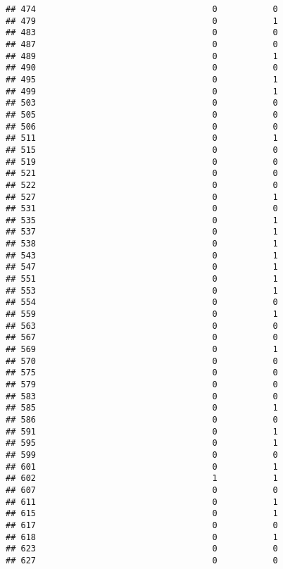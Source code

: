 \documentclass[
]{article}
\begin{document}
\begin{verbatim}
## 474                                   0           0
## 479                                   0           1
## 483                                   0           0
## 487                                   0           0
## 489                                   0           1
## 490                                   0           0
## 495                                   0           1
## 499                                   0           1
## 503                                   0           0
## 505                                   0           0
## 506                                   0           0
## 511                                   0           1
## 515                                   0           0
## 519                                   0           0
## 521                                   0           0
## 522                                   0           0
## 527                                   0           1
## 531                                   0           0
## 535                                   0           1
## 537                                   0           1
## 538                                   0           1
## 543                                   0           1
## 547                                   0           1
## 551                                   0           1
## 553                                   0           1
## 554                                   0           0
## 559                                   0           1
## 563                                   0           0
## 567                                   0           0
## 569                                   0           1
## 570                                   0           0
## 575                                   0           0
## 579                                   0           0
## 583                                   0           0
## 585                                   0           1
## 586                                   0           0
## 591                                   0           1
## 595                                   0           1
## 599                                   0           0
## 601                                   0           1
## 602                                   1           1
## 607                                   0           0
## 611                                   0           1
## 615                                   0           1
## 617                                   0           0
## 618                                   0           1
## 623                                   0           0
## 627                                   0           0

\end{verbatim}
\end{document}
